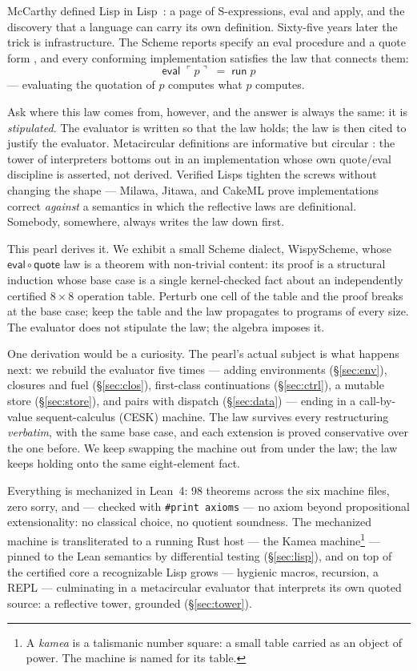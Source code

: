 \documentclass[acmsmall,screen,review]{acmart}
\begin{document}
McCarthy defined Lisp in Lisp~\cite{mccarthy60}: a page of
S-expressions, \textsf{eval} and \textsf{apply}, and the discovery
that a language can carry its own definition. Sixty-five years later
the trick is infrastructure. The Scheme reports specify an
\textsf{eval} procedure and a \textsf{quote} form
\cite{r7rs}, and every conforming implementation satisfies the law
that connects them:
\[
  \mathsf{eval}\;\ulcorner p \urcorner \;=\; \mathsf{run}\; p
\]
--- evaluating the quotation of $p$ computes what $p$ computes.

Ask where this law comes from, however, and the answer is always the
same: it is \emph{stipulated}. The evaluator is written so that the
law holds; the law is then cited to justify the evaluator.
Metacircular definitions are informative but circular
\cite{reynolds72}: the tower of interpreters bottoms out in an
implementation whose own quote/eval discipline is asserted, not
derived. Verified Lisps tighten the screws without changing the
shape --- Milawa, Jitawa, and CakeML
\cite{myreen11,davis15,kumar14} prove implementations correct
\emph{against} a semantics in which the reflective laws are
definitional. Somebody, somewhere, always writes the law down first.

This pearl derives it. We exhibit a small Scheme dialect,
WispyScheme, whose $\mathsf{eval} \circ \mathsf{quote}$ law is a
theorem with non-trivial content: its proof is a structural induction whose base
case is a single kernel-checked fact about an independently certified
$8 \times 8$ operation table. Perturb one cell of the table and the
proof breaks at the base case; keep the table and the law propagates
to programs of every size. The evaluator does not stipulate the law;
the algebra imposes it.

One derivation would be a curiosity. The pearl's actual subject is
what happens next: we rebuild the evaluator five times --- adding
environments (\S\ref{sec:env}), closures and fuel (\S\ref{sec:clos}),
first-class continuations (\S\ref{sec:ctrl}), a mutable store
(\S\ref{sec:store}), and pairs with dispatch (\S\ref{sec:data}) ---
ending in a call-by-value sequent-calculus (CESK) machine. The law
survives every restructuring \emph{verbatim}, with the same base
case, and each extension is proved conservative over the one before.
We keep swapping the machine out from under the law; the law keeps
holding onto the same eight-element fact.

Everything is mechanized in Lean~4: 98 theorems across the six
machine files, zero \textsf{sorry}, and --- checked with
\verb|#print axioms| --- no axiom beyond propositional
extensionality: no classical choice, no quotient soundness. The
mechanized machine is transliterated to a running Rust host --- the
Kamea machine\footnote{A \emph{kamea} is a talismanic number square:
a small table carried as an object of power. The machine is named
for its table.} --- pinned to
the Lean semantics by differential testing (\S\ref{sec:lisp}), and on
top of the certified core a recognizable Lisp grows --- hygienic
macros, recursion, a REPL --- culminating in a metacircular evaluator
that interprets its own quoted source: a reflective tower, grounded
(\S\ref{sec:tower}).
\end{document}
